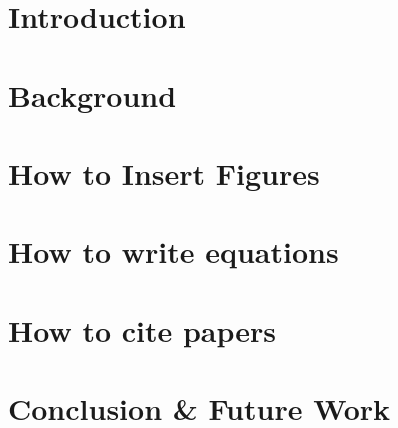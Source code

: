 \documentclass[12pt]{report}
\begin{document}

\thesistitlepage

\thesiscopyrightpage          
    
	
\thesisabstract

\thesisdedicationpage


\makeatletter \renewcommand{\@dotsep}{10000} \makeatother

\renewcommand{\contentsname}{\normalsize{Table of Contents}}
\tableofcontents



\newpage
{}

\chapter{Introduction}
\label{chp::introduction}


\chapter{Background}
\label{chp::background}


\chapter{How to Insert Figures}
\label{chp::without_uncertainty}


\chapter{How to write equations}
\label{chp::with_uncertainty}


\chapter{How to cite papers}
\label{chp::citations}


\chapter{Conclusion \& Future Work}
\label{chp::conclusions}





\end{document}
